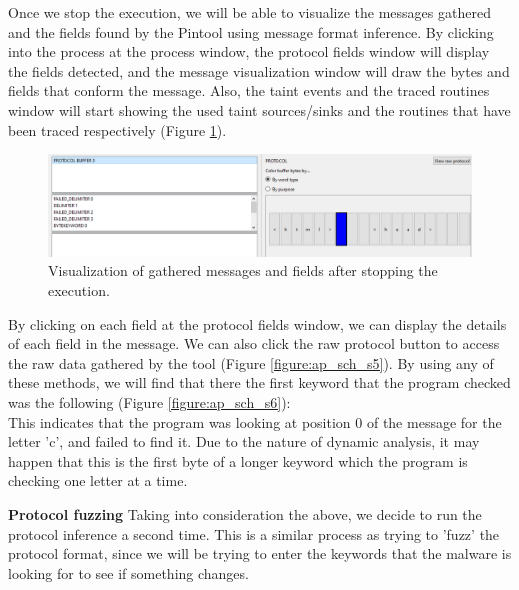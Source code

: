 \documentclass[conference]{IEEEtran}
\begin{document}
Once we stop the execution, we will be able to visualize the messages gathered and the fields found by the Pintool
using message format inference. By clicking into the process at the process window, the 
protocol fields window will display the fields detected, and the message visualization window will draw the bytes
and fields that conform the message. Also, the taint events and the traced routines window 
will start showing the used taint sources/sinks and the routines that have been traced respectively (Figure \ref{figure:ap_sch_s4}).

\begin{figure}[htbp]
    \centerline{\includegraphics[width=1.0\columnwidth]{images/sch_s4.png}}
    \caption{Visualization of gathered messages and fields after stopping the execution.}
    \label{figure:ap_sch_s4}
\end{figure}

By clicking on each field at the protocol fields window, we can display the details of each field in the message.
We can also click the raw protocol button to access the raw data gathered by the tool (Figure \ref{figure:ap_sch_s5}). By using any of these
methods, we will find that there the first keyword that the program checked was the following (Figure \ref{figure:ap_sch_s6}):
\noindent{}\\

This indicates that the program was looking at position 0 of the message for the letter 'c', and failed
to find it. Due to the nature of dynamic analysis, it may happen that this is the first byte of a longer
keyword which the program is checking one letter at a time. 

\textbf{Protocol fuzzing}
Taking into consideration the above, we decide to run the protocol inference a second time. This is a similar 
process as trying to 'fuzz' the protocol format, since we will be trying to enter the keywords that the 
malware is looking for to see if something changes.
\end{document}
